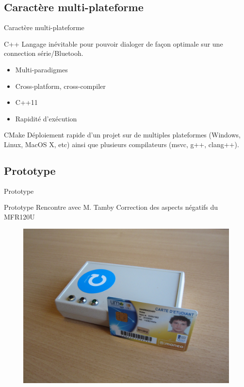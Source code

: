 \subsection{Caractère multi-plateforme}
\begin{frame}{Caractère multi-plateforme}
	\begin{block}{C++}
        Langage inévitable pour pouvoir dialoger de façon optimale sur une connection
        série/Bluetooh.

	    \begin{itemize}
            \item Multi-paradigmes
            \item Cross-platform, cross-compiler
            \item C++11
            \item Rapidité d'exécution
	    \end{itemize}
	\end{block}

	\begin{block}{CMake}
        Déploiement rapide d'un projet sur de multiples plateformes (Windows, Linux,
    MacOS X, etc) ainsi que plusieurs compilateurs (msvc, g++, clang++).
	\end{block}
\end{frame}


\subsection{Prototype}
\begin{frame}{Prototype}
	\begin{block}{Prototype}
        Rencontre avec M. Tamby
        Correction des aspects négatifs du MFR120U
	\end{block}

    \begin{figure}[h]
        \begin{center}
            \includegraphics[scale=0.4]{images/proto.jpg} 
        \end{center}
     \end{figure} 
\end{frame}


